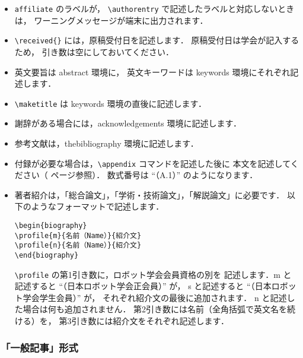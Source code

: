 \documentclass[paper]{jrsj}    %
\begin{document}
\begin{itemize}
記述に際していくつかの注意があります．
 \begin{itemize}
 \item
 第1引き数は \verb/\authorentry/ で指定したラベルを記述します．
 第2引き数には邦文の所属を，第3引き数には英文の所属を記述します．
 \item
 ラベルの前後に余分なスペースを挿入しないでください．
 \item
 \verb/\authorentry/ で記述したラベルの出現順に記述してください．
 \end{itemize}
\item
\verb/affiliate/ のラベルが，
\verb/\authorentry/ で記述したラベルと対応しないときは，
ワーニングメッセージが端末に出力されます．
\item
\verb/\received{}/ には，原稿受付日を記述します．
原稿受付日は学会が記入するため，
引き数は空にしておいてください．
\item
英文要旨は abstract 環境に，
英文キーワードは keywords 環境にそれぞれ記述します．
\item
\verb/\maketitle/ は keywords 環境の直後に記述します．
\item
謝辞がある場合には，acknowledgements 環境に記述します．
\item
参考文献は，thebibliography 環境に記述します．
\item
付録が必要な場合は，\verb/\appendix/ コマンドを記述した後に
本文を記述してください（\pageref{sec:app} ページ参照）．
数式番号は ``（A.1）'' のようになります．
\item
著者紹介は，「総合論文」，「学術・技術論文」，「解説論文」に必要です．
以下のようなフォーマットで記述します．
\begin{verbatim}
\begin{biography}
\profile{m}{名前（Name）}{紹介文}
\profile{n}{名前（Name）}{紹介文}
\end{biography}
\end{verbatim}
\verb/\profile/ の第1引き数に，ロボット学会会員資格の別を
記述します．{\ttfamily m} と記述すると ``（日本ロボット学会正会員）'' が，
{\ttfamily s} と記述すると ``（日本ロボット学会学生会員）'' が，
それぞれ紹介文の最後に追加されます．
{\ttfamily n} と記述した場合は何も追加されません．
第2引き数には名前（全角括弧で英文名を続ける）を，
第3引き数には紹介文をそれぞれ記述します．
\end{itemize}

\subsubsection{「一般記事」形式}\label{sec:article}
\end{document}
